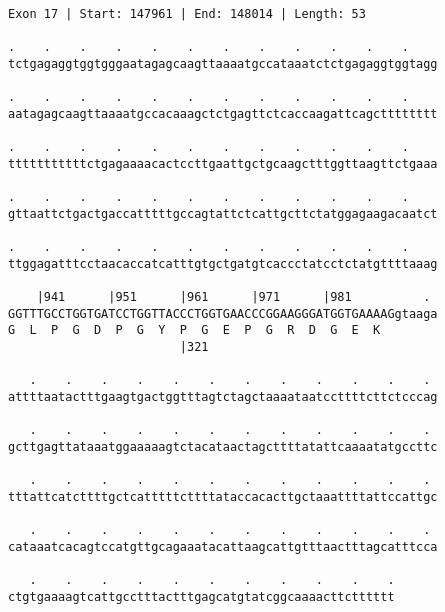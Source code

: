 \documentclass{article}
\begin{document}
\newpage
\begin{Verbatim}[fontfamily=courier]
Exon 17 | Start: 147961 | End: 148014 | Length: 53

.    .    .    .    .    .    .    .    .    .    .    .    
tctgagaggtggtgggaatagagcaagttaaaatgccataaatctctgagaggtggtagg

.    .    .    .    .    .    .    .    .    .    .    .    
aatagagcaagttaaaatgccacaaagctctgagttctcaccaagattcagctttttttt

.    .    .    .    .    .    .    .    .    .    .    .    
tttttttttttctgagaaaacactccttgaattgctgcaagctttggttaagttctgaaa

.    .    .    .    .    .    .    .    .    .    .    .    
gttaattctgactgaccatttttgccagtattctcattgcttctatggagaagacaatct

.    .    .    .    .    .    .    .    .    .    .    .    
ttggagatttcctaacaccatcatttgtgctgatgtcaccctatcctctatgttttaaag

    |941      |951      |961      |971      |981          . 
GGTTTGCCTGGTGATCCTGGTTACCCTGGTGAACCCGGAAGGGATGGTGAAAAGgtaaga
G  L  P  G  D  P  G  Y  P  G  E  P  G  R  D  G  E  K        
                        |321                                

   .    .    .    .    .    .    .    .    .    .    .    . 
attttaatactttgaagtgactggtttagtctagctaaaataatccttttcttctcccag

   .    .    .    .    .    .    .    .    .    .    .    . 
gcttgagttataaatggaaaaagtctacataactagcttttatattcaaaatatgccttc

   .    .    .    .    .    .    .    .    .    .    .    . 
tttattcatcttttgctcatttttcttttataccacacttgctaaattttattccattgc

   .    .    .    .    .    .    .    .    .    .    .    . 
cataaatcacagtccatgttgcagaaatacattaagcattgtttaactttagcatttcca

   .    .    .    .    .    .    .    .    .    .    .
ctgtgaaaagtcattgcctttactttgagcatgtatcggcaaaacttctttttt
\end{Verbatim}
\newpage
\end{document}
